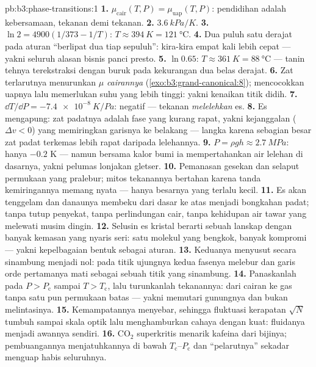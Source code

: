 \begin{solution}{pb:b3:phase-transitions:1}
\textbf{1.} $\mu_{\text{cair}}(T, P) = \mu_{\text{uap}}(T,
P)$: pendidihan adalah kebersamaan, tekanan demi tekanan.
\textbf{2.} $\qty{3.6}{kPa/K}$.
\textbf{3.} $\ln2 = 4900(1/373 - 1/T)$: $T \approx \qty{394}{K} =
\qty{121}{\celsius}$.
\textbf{4.} Dua puluh satu derajat pada aturan ``berlipat dua tiap
sepuluh'': kira-kira empat kali lebih cepat --- yakni seluruh alasan
bisnis panci presto.
\textbf{5.} $\ln0.65$: $T \approx \qty{361}{K} =
\qty{88}{\celsius}$ --- tanin tehnya terekstraksi dengan buruk pada
kekurangan dua belas derajat.
\textbf{6.} Zat terlarutnya menurunkan $\mu$ \emph{cairannya}
(\cref{exo:b3:grand-canonical:8}); mencocokkan uapnya lalu memerlukan
suhu yang lebih tinggi: yakni kenaikan titik didih.
\textbf{7.} $\dd T/\dd P = \qty{-7.4e-8}{K/Pa}$: negatif ---
tekanan \emph{melelehkan} es.
\textbf{8.} Es mengapung: zat padatnya adalah fase yang kurang rapat,
yakni kejanggalan ($\Delta v < 0$) yang memiringkan garisnya ke belakang
--- langka karena sebagian besar zat padat terkemas lebih rapat daripada
lelehannya.
\textbf{9.} $P = \rho gh \approx \qty{2.7}{MPa}$: hanya
$-0.2$ K --- namun bersama kalor bumi ia mempertahankan air lelehan di
dasarnya, yakni pelumas lonjakan gletser.
\textbf{10.} Pemanasan gesekan dan selaput permukaan yang pralebur;
mitos tekanannya bertahan karena tanda kemiringannya memang nyata
--- hanya besarnya yang terlalu kecil.
\textbf{11.} Es akan tenggelam dan danaunya membeku dari dasar ke atas
menjadi bongkahan padat; tanpa tutup penyekat, tanpa perlindungan cair,
tanpa kehidupan air tawar yang melewati musim dingin.
\textbf{12.} Selusin es kristal berarti sebuah lanskap 
dengan banyak kemasan yang nyaris seri: satu molekul yang bengkok,
banyak kompromi --- yakni kepelbagaian bentuk sebagai aturan.
\textbf{13.} Keduanya menyusut secara sinambung menjadi nol: pada titik
ujungnya kedua fasenya melebur dan garis orde pertamanya mati sebagai
sebuah titik yang sinambung.
\textbf{14.} Panaskanlah pada $P > P_{\text{c}}$ sampai $T > T_{\text{c}}$,
lalu turunkanlah tekanannya: dari cairan ke gas tanpa satu pun
permukaan batas --- yakni memutari gunungnya dan bukan melintasinya.
\textbf{15.} Kemampatannya menyebar, sehingga fluktuasi kerapatan
$\sqrt N$ tumbuh sampai skala optik lalu menghamburkan cahaya dengan kuat:
fluidanya menjadi awannya sendiri.
\textbf{16.} CO$_2$ superkritis menarik kafeina dari bijinya;
pembuangannya menjatuhkannya di bawah $T_{\text{c}}$--$P_{\text{c}}$ dan
``pelarutnya'' sekadar menguap habis seluruhnya.

\end{solution}
